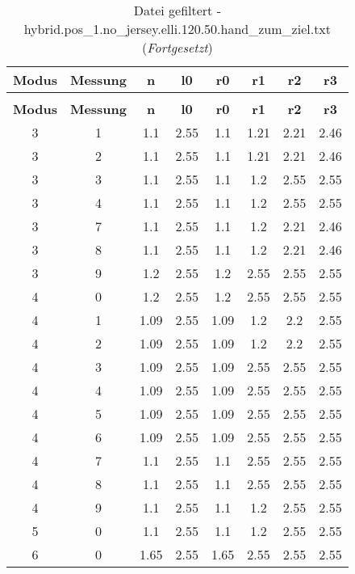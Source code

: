 \begin{longtable}{|c|c||c||c||c|c|c|c|}
	\caption{Datei gefiltert - hybrid.pos\_1.no\_jersey.elli.120.50.hand\_zum\_ziel.txt} \label{tab:hybrid.pos-1.no-jersey.elli.120.50.hand-zum-ziel.txt} \\ \hline
	\textbf{Modus} & \textbf{Messung} & \textbf{n} & \textbf{l0} & \textbf{r0} & \textbf{r1} & \textbf{r2} & \textbf{r3}\\ \hline
	\endfirsthead
	\caption[]{Datei gefiltert - hybrid.pos\_1.no\_jersey.elli.120.50.hand\_zum\_ziel.txt (\emph{Fortgesetzt})} \\ \hline
	\textbf{Modus} & \textbf{Messung} & \textbf{n} & \textbf{l0} & \textbf{r0} & \textbf{r1} & \textbf{r2} & \textbf{r3}\\ \hline
	\endhead
	3 & 1 & 1.1 & 2.55 & 1.1 & 1.21 & 2.21 & 2.46 \\ \hline
	3 & 2 & 1.1 & 2.55 & 1.1 & 1.21 & 2.21 & 2.46 \\ \hline
	3 & 3 & 1.1 & 2.55 & 1.1 & 1.2 & 2.55 & 2.55 \\ \hline
	3 & 4 & 1.1 & 2.55 & 1.1 & 1.2 & 2.55 & 2.55 \\ \hline
	3 & 7 & 1.1 & 2.55 & 1.1 & 1.2 & 2.21 & 2.46 \\ \hline
	3 & 8 & 1.1 & 2.55 & 1.1 & 1.2 & 2.21 & 2.46 \\ \hline
	3 & 9 & 1.2 & 2.55 & 1.2 & 2.55 & 2.55 & 2.55 \\ \hline
	4 & 0 & 1.2 & 2.55 & 1.2 & 2.55 & 2.55 & 2.55 \\ \hline
	4 & 1 & 1.09 & 2.55 & 1.09 & 1.2 & 2.2 & 2.55 \\ \hline
	4 & 2 & 1.09 & 2.55 & 1.09 & 1.2 & 2.2 & 2.55 \\ \hline
	4 & 3 & 1.09 & 2.55 & 1.09 & 2.55 & 2.55 & 2.55 \\ \hline
	4 & 4 & 1.09 & 2.55 & 1.09 & 2.55 & 2.55 & 2.55 \\ \hline
	4 & 5 & 1.09 & 2.55 & 1.09 & 2.55 & 2.55 & 2.55 \\ \hline
	4 & 6 & 1.09 & 2.55 & 1.09 & 2.55 & 2.55 & 2.55 \\ \hline
	4 & 7 & 1.1 & 2.55 & 1.1 & 2.55 & 2.55 & 2.55 \\ \hline
	4 & 8 & 1.1 & 2.55 & 1.1 & 2.55 & 2.55 & 2.55 \\ \hline
	4 & 9 & 1.1 & 2.55 & 1.1 & 1.2 & 2.55 & 2.55 \\ \hline
	5 & 0 & 1.1 & 2.55 & 1.1 & 1.2 & 2.55 & 2.55 \\ \hline
	6 & 0 & 1.65 & 2.55 & 1.65 & 2.55 & 2.55 & 2.55 \\ \hline

\end{longtable}

